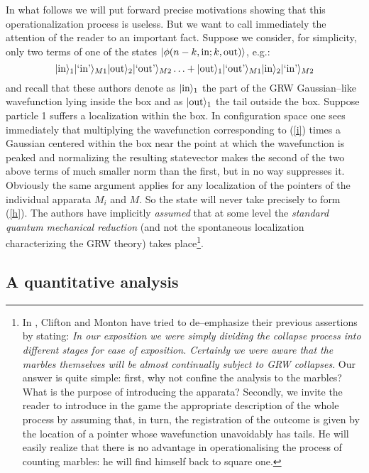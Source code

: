 \documentclass[10pt,a4paper]{article}
\begin{document}
In what follows we will put forward precise motivations showing
that this operationalization process is useless. But we want to
call immediately the attention of the reader to an important fact.
Suppose we consider, for simplicity, only two terms of one of the
states $|\phi (n-k,\makebox{in};k,\makebox{out})\rangle$, e.g.:
\begin{equation} \label{i}
|\makebox{in}\rangle_{1} |\makebox{`in'}\rangle_{M1}
|\makebox{out}\rangle_{2} |\makebox{`out'}\rangle_{M2} \ldots +
|\makebox{out}\rangle_{1} |\makebox{`out'}\rangle_{M1}
|\makebox{in}\rangle_{2} |\makebox{`in'}\rangle_{M2}
\end{equation}
and recall that these authors denote as $|\makebox{in}\rangle_{1}$
the part of the GRW Gaussian--like wavefunction lying inside the
box and as $|\makebox{out}\rangle_{1}$ the tail outside the box.
Suppose particle 1 suffers a localization within the box. In
configuration space one sees immediately that multiplying the
wavefunction corresponding to (\ref{i}) times a Gaussian centered
within the box near the point at which the wavefunction is peaked
and normalizing the resulting statevector makes the second of the
two above terms of much smaller norm than the first, but in no way
suppresses it. Obviously the same argument applies for any
localization of the pointers of the individual apparata $M_{i}$
and $M$. So the state will never take precisely to form (\ref{h}).
The authors have implicitly {\it assumed} that at some level the
{\it standard quantum mechanical reduction} (and not the
spontaneous localization characterizing the GRW theory) takes
place\footnote{In \cite{cli2}, Clifton and Monton have tried to
de--emphasize their previous assertions by stating: {\it In our
exposition we were simply dividing the collapse process into
different stages for ease of exposition. Certainly we were aware
that the marbles themselves will be almost continually subject to
GRW collapses}. Our answer is quite simple: first, why not confine
the analysis to the marbles? What is the purpose of introducing
the apparata? Secondly, we invite the reader to introduce in the
game the appropriate description of the whole process by assuming
that, in turn, the registration of the outcome is given by the
location of a pointer whose wavefunction unavoidably has tails. He
will easily realize that there is no advantage in operationalising
the process of counting marbles: he will find himself back to
square one.}.

\subsection{A quantitative analysis} \label{sec133}
\end{document}
